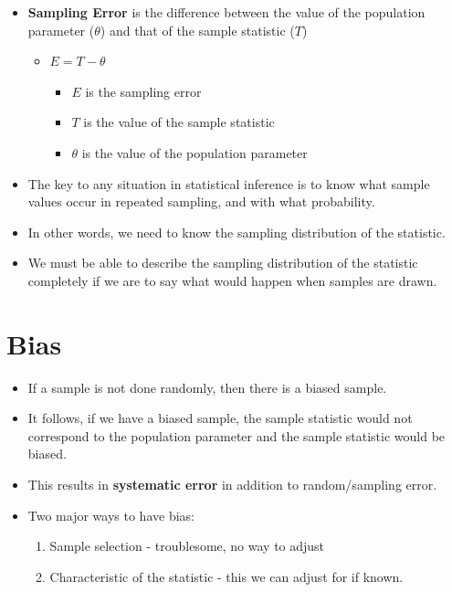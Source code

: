 \documentclass[12pt]{article}
\begin{document}
\begin{itemize}
\itemsep1pt\parskip0pt
\item
  \textbf{Sampling Error} is the difference between the value of the
  population parameter (\(\theta\)) and that of the sample statistic
  (\(T\))

  \begin{itemize}
  \itemsep1pt\parskip0pt
  \item
    \(E = T - \theta\)

    \begin{itemize}
    \itemsep1pt\parskip0pt
    \item
      \(E\) is the sampling error
    \item
      \(T\) is the value of the sample statistic
    \item
      \(\theta\) is the value of the population parameter
    \end{itemize}
  \end{itemize}
\item
  The key to any situation in statistical inference is to know what
  sample values occur in repeated sampling, and with what probability.
\item
  In other words, we need to know the sampling distribution of the
  statistic.
\item
  We must be able to describe the sampling distribution of the statistic
  completely if we are to say what would happen when samples are drawn.
\end{itemize}

\section{Bias}\label{bias}

\begin{itemize}
\itemsep1pt\parskip0pt
\item
  If a sample is not done randomly, then there is a biased sample.
\item
  It follows, if we have a biased sample, the sample statistic would not
  correspond to the population parameter and the sample statistic would
  be biased.
\item
  This results in \textbf{systematic error} in addition to
  random/sampling error.
\item
  Two major ways to have bias:

  \begin{enumerate}
  \def\labelenumi{\arabic{enumi}.}
  \itemsep1pt\parskip0pt
  \item
    Sample selection - troublesome, no way to adjust
  \item
    Characteristic of the statistic - this we can adjust for if known.
  \end{enumerate}
\end{itemize}
\end{document}
